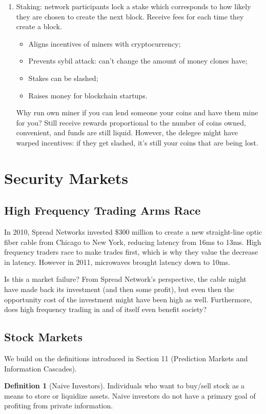 \documentclass[dvipsnames]{article}
\theoremstyle{definition}
\newtheorem{definition}{Definition}[section]
\theoremstyle{remark}
\begin{document}
\begin{enumerate}
	\item Staking: network participants lock a stake which corresponds to how likely they are chosen to create the next block. Receive fees for each time they create a block.
	\begin{itemize}
		\item Aligns incentives of miners with cryptocurrency;
		\item Prevents sybil attack: can't change the amount of money clones have;
		\item Stakes can be slashed;
		\item Raises money for blockchain startups.
	\end{itemize}
	Why run own miner if you can lend someone your coins and have them mine for you? Still receive rewards proportional to the number of coins owned, convenient, and funds are still liquid. However, the delegee might have warped incentives: if they get slashed, it's still your coins that are being lost.  
\end{enumerate}

\section{Security Markets}

\subsection{High Frequency Trading Arms Race}
In 2010, Spread Networks invested \$300 million to create a new straight-line optic fiber cable from Chicago to New York, reducing latency from 16ms to 13ms. High frequency traders race to make trades first, which is why they value the decrease in latency. However in 2011, microwaves brought latency down to 10ms. 

Is this a market failure? From Spread Network's perspective, the cable might have made back its investment (and then some profit), but even then the opportunity cost of the investment might have been high as well. Furthermore, does high frequency trading in and of itself even benefit society?

\subsection{Stock Markets}

We build on the definitions introduced in Section 11 (Prediction Markets and Information Cascades). 

\begin{definition}[Naive Investors]
	Individuals who want to buy/sell stock as a means to store or liquidize assets. Naive investors do not have a primary goal of profiting from private information.
\end{definition}
\end{document}
